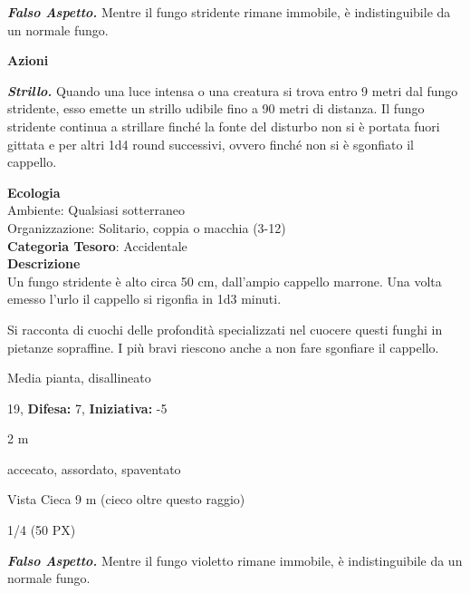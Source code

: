 \begin{multicols}{2}
{\emph{\textbf{Falso Aspetto.}} Mentre il fungo stridente rimane immobile, è indistinguibile da un normale fungo.

\textbf{Azioni}

\emph{\textbf{Strillo.}} Quando una luce intensa o una creatura si trova entro 9 metri dal fungo stridente, esso emette un strillo udibile fino a 90 metri di distanza. Il fungo stridente continua a strillare finché la fonte del disturbo non si è portata fuori gittata e per altri 1d4 round successivi, ovvero finché non si è sgonfiato il cappello.

\textbf{Ecologia}\\
Ambiente: Qualsiasi sotterraneo\\
Organizzazione: Solitario, coppia o macchia (3-12)\\
\textbf{Categoria Tesoro}: Accidentale\\
\textbf{Descrizione}\\
Un fungo stridente è alto circa 50 cm, dall'ampio cappello marrone. Una volta emesso l'urlo il cappello si rigonfia in 1d3 minuti.

Si racconta di cuochi delle profondità specializzati nel cuocere questi funghi in pietanze sopraffine. I più bravi riescono anche a non fare sgonfiare il cappello.

\noindent
\begin{description}[noitemsep, topsep=0pt, parsep=0pt, partopsep=0pt, leftmargin=0cm, labelwidth=2.2cm]
	\item[\textbf{Taglia/Tipo:}] Media pianta, disallineato
	\item[\textbf{Caratt.:}] 
	\item[\textbf{Punti Ferita:}] 19,  \textbf{Difesa:} 7,  \textbf{Iniziativa:} -5
	\item[\textbf{Movimento:}] 2 m
	\item[\textbf{Tiri Salvez.:}] 
	\item[\textbf{Immunità:}] accecato, assordato, spaventato
	\item[\textbf{Sensi:}] Vista Cieca 9 m (cieco oltre questo raggio)
	\item[\textbf{Sfida:}] 1/4 (50 PX)\smallskip
\end{description}

\emph{\textbf{Falso Aspetto.}} Mentre il fungo violetto rimane immobile, è indistinguibile da un normale fungo.

}
\end{multicols}
